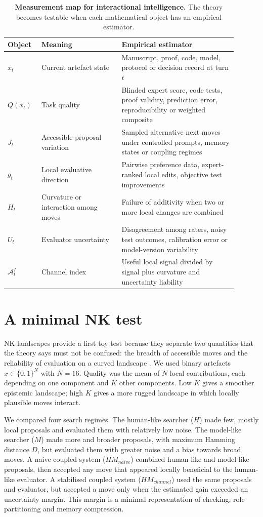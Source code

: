\documentclass[11pt]{article}
\newcommand{\Aint}{\mathcal{A}^{I}}
\begin{document}
\begin{table}[t]
\centering
\small
\caption{\textbf{Measurement map for interactional intelligence.} The theory becomes testable when each mathematical object has an empirical estimator.}
\begin{tabular}{p{0.12\linewidth}p{0.32\linewidth}p{0.46\linewidth}}
\toprule
Object & Meaning & Empirical estimator \\
\midrule
$x_t$ & Current artefact state & Manuscript, proof, code, model, protocol or decision record at turn $t$ \\
$Q(x_t)$ & Task quality & Blinded expert score, code tests, proof validity, prediction error, reproducibility or weighted composite \\
$J_t$ & Accessible proposal variation & Sampled alternative next moves under controlled prompts, memory states or coupling regimes \\
$g_t$ & Local evaluative direction & Pairwise preference data, expert-ranked local edits, objective test improvements \\
$H_t$ & Curvature or interaction among moves & Failure of additivity when two or more local changes are combined \\
$U_t$ & Evaluator uncertainty & Disagreement among raters, noisy test outcomes, calibration error or model-version variability \\
$\Aint_t$ & Channel index & Useful local signal divided by signal plus curvature and uncertainty liability \\
\bottomrule
\end{tabular}
\label{tab:measurement_map}
\end{table}

\section*{A minimal NK test}

NK landscapes provide a first toy test because they separate two quantities that the theory says must not be confused: the breadth of accessible moves and the reliability of evaluation on a curved landscape \cite{Kauffman1987,Weinberger1991}. We used binary artefacts $x\in\{0,1\}^N$ with $N=16$. Quality was the mean of $N$ local contributions, each depending on one component and $K$ other components. Low $K$ gives a smoother epistemic landscape; high $K$ gives a more rugged landscape in which locally plausible moves interact.

We compared four search regimes. The human-like searcher ($H$) made few, mostly local proposals and evaluated them with relatively low noise. The model-like searcher ($M$) made more and broader proposals, with maximum Hamming distance $D$, but evaluated them with greater noise and a bias towards broad moves. A naive coupled system ($HM_{naive}$) combined human-like and model-like proposals, then accepted any move that appeared locally beneficial to the human-like evaluator. A stabilised coupled system ($HM_{channel}$) used the same proposals and evaluator, but accepted a move only when the estimated gain exceeded an uncertainty margin. This margin is a minimal representation of checking, role partitioning and memory compression.
\end{document}
